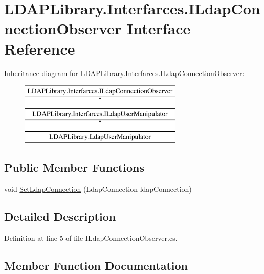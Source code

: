 \hypertarget{interface_l_d_a_p_library_1_1_interfarces_1_1_i_ldap_connection_observer}{}\section{L\+D\+A\+P\+Library.\+Interfarces.\+I\+Ldap\+Connection\+Observer Interface Reference}
\label{interface_l_d_a_p_library_1_1_interfarces_1_1_i_ldap_connection_observer}
Inheritance diagram for L\+D\+A\+P\+Library.\+Interfarces.\+I\+Ldap\+Connection\+Observer\+:\begin{figure}[H]
\begin{center}
\leavevmode
\includegraphics[height=3.000000cm]{interface_l_d_a_p_library_1_1_interfarces_1_1_i_ldap_connection_observer}
\end{center}
\end{figure}
\subsection*{Public Member Functions}
\begin{DoxyCompactItemize}
\item 
void \hyperlink{interface_l_d_a_p_library_1_1_interfarces_1_1_i_ldap_connection_observer_aa411ec841d11b2047fb8228cf2b609a3}{Set\+Ldap\+Connection} (Ldap\+Connection ldap\+Connection)
\end{DoxyCompactItemize}


\subsection{Detailed Description}


Definition at line 5 of file I\+Ldap\+Connection\+Observer.\+cs.



\subsection{Member Function Documentation}
\hypertarget{interface_l_d_a_p_library_1_1_interfarces_1_1_i_ldap_connection_observer_aa411ec841d11b2047fb8228cf2b609a3}{}

